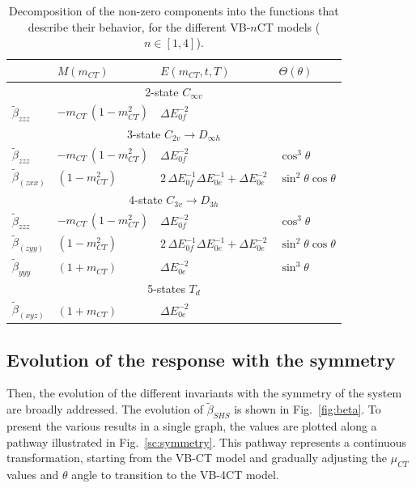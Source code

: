 \documentclass[USenglish]{article}
\begin{document}
\begin{table}
	
	\caption{Decomposition of the non-zero components into the functions that describe their behavior,  for the different VB-$n$CT models ($n\in[1,4]$).}
	\label{tab:dec}
	\begin{tabular}{llll}
		&$M(m_{CT})$ & $E(m_{CT}, t, T)$ & $\Theta(\theta)$ \\
		\midrule
		\multicolumn{4}{c}{2-state $C_{\infty v}$} \\
		\midrule
		$\tilde\beta_{zzz}$ & $-m_{CT}\,(1-m_{CT}^2)$ & $\Delta E_{0f}^{-2}$ & \\
		\midrule
		\multicolumn{4}{c}{3-state $C_{2v}\rightarrow D_{\infty h}$}\\
		\midrule
		$\tilde\beta_{zzz}$ & $-m_{CT}\,(1-m_{CT}^2)$ & $\Delta E_{0f}^{-2}$ & $\cos^3\theta$ \\
		$\tilde\beta_{(zxx)}$ & $(1-m_{CT}^2)$ & $2\,\Delta E_{0f}^{-1}\Delta E_{0e}^{-1}+\Delta E_{0e}^{-2}$ & $\sin^2\theta\cos\theta$\\
		\midrule
		\multicolumn{4}{c}{4-state $C_{3v}\rightarrow D_{3h}$} \\
		\midrule
		$\tilde\beta_{zzz}$ & $-m_{CT}\,(1-m_{CT}^2)$ & $\Delta E_{0f}^{-2}$ & $\cos^3\theta$\\
		$\tilde\beta_{(zyy)}$ & $(1-m_{CT}^2)$ & $2\,\Delta E_{0f}^{-1}\Delta E_{0e}^{-1}+\Delta E_{0e}^{-2}$ & $\sin^2\theta\cos\theta$\\
		$\tilde\beta_{yyy}$ & $ (1+m_{CT})$ & $\Delta E_{0e}^{-2}$ & $\sin^3\theta$\\
		\midrule
		\multicolumn{4}{c}{5-states $T_d$} \\
		\midrule
		$\tilde\beta_{(xyz)}$ & $ (1+m_{CT})$ & $\Delta E_{0e}^{-2}$ & \\
	\end{tabular}
\end{table}

\subsection{Evolution of the response with the symmetry}

Then, the evolution of the different invariants with the symmetry of the system are broadly addressed.
The evolution of $\tilde\beta_{SHS}$ is shown in Fig.~\ref{fig:beta}. To present the various results in a single graph, the values are plotted along a pathway illustrated in Fig.~\ref{sc:symmetry}. This pathway represents a continuous transformation, starting from the VB-CT model and gradually adjusting the $\mu_{CT}$ values and $\theta$ angle to transition to the VB-4CT model.
\end{document}
